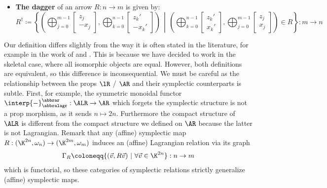 \begin{definition}
\begin{itemize}
    \item \textbf{The dagger} of an arrow \(R:n\to m\) is given by:
    \begin{equation*}
       R^\dag \coloneqq 
      \left\{
        \left(\bigoplus_{j=0}^{m-1} \begin{bmatrix} z_j \\ -x_j \end{bmatrix}, \bigoplus_{k=0}^{n-1} \begin{bmatrix} z_k' \\ -x_k' \end{bmatrix} \right)
       \,\middle|\, 
        \left(\bigoplus_{k=0}^{n-1}\begin{bmatrix} z_k' \\ x_k'\end{bmatrix}, \bigoplus_{j=0}^{m-1} \begin{bmatrix} z_j \\ x_j \end{bmatrix}  \right)\in R
      \right\} :m\to n
    \end{equation*}
  \end{itemize}
\end{definition}
Our definition differs slightly from the way it is often stated in the literature, for example in the work of \textcite{weinstein_symplectic_2009} and \textcite{network}.  This is because we have decided to work in the skeletal case, where all isomorphic objects are equal. However, both definitions are equivalent, so this difference is inconsequential.
We must be careful as the relationship between the props \(\lR\) / \(\AR\) and their symplectic counterparts is subtle. First, for example, the symmetric monoidal functor \(\interp{-}_{\abbralagr}^{\abbrar}:\ALR \to \AR \) which forgets the symplectic structure is not a prop morphism, as it sends \(n\mapsto 2n\). Furthermore the compact structure of \(\ALR\) is different from the compact structure we defined on \(\AR\) because the latter is not Lagrangian.
Remark that any (affine) symplectic map \(R: (\K^{2n},\omega_n) \to (\K^{2m},\omega_m)\) induces an (affine) Lagrangian relation via its graph
 \[ \Gamma_R\coloneqq \{(\vec v, R \vec v) \ | \ \forall \vec  v \in \K^{2n} \}:n\to m\]
which is functorial, so these categories of symplectic relations strictly generalize (affine) symplectic maps. 

